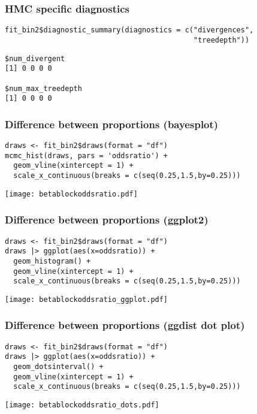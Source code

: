 \documentclass[finnish,english,t]{beamer}
\begin{document}
\begin{frame}[fragile]
  \frametitle{HMC specific diagnostics}
  
  {\small
\begin{lstlisting}[]
fit_bin2$diagnostic_summary(diagnostics = c("divergences",
                                            "treedepth"))
\end{lstlisting}
  }

  {\scriptsize
\begin{lstlisting}
$num_divergent
[1] 0 0 0 0

$num_max_treedepth
[1] 0 0 0 0
\end{lstlisting}
  }

\end{frame}

\begin{frame}[fragile]
  \frametitle{Difference between proportions (bayesplot)}
  
  {\small
\begin{lstlisting}
draws <- fit_bin2$draws(format = "df")
mcmc_hist(draws, pars = 'oddsratio') +
  geom_vline(xintercept = 1) +
  scale_x_continuous(breaks = c(seq(0.25,1.5,by=0.25)))
\end{lstlisting}
  }

  \begin{center}
  \texttt{[image: betablockoddsratio.pdf]}
\end{center}
\end{frame}

\begin{frame}[fragile]
  \frametitle{Difference between proportions (ggplot2)}

  \vspace{-0.5\baselineskip}
  {\small
\begin{lstlisting}
draws <- fit_bin2$draws(format = "df")
draws |> ggplot(aes(x=oddsratio)) +
  geom_histogram() +
  geom_vline(xintercept = 1) +
  scale_x_continuous(breaks = c(seq(0.25,1.5,by=0.25)))
\end{lstlisting}
  }

  \begin{center}
  \texttt{[image: betablockoddsratio\_ggplot.pdf]}
\end{center}
\end{frame}

\begin{frame}[fragile]
  \frametitle{Difference between proportions (ggdist dot plot)}
  
  \vspace{-0.5\baselineskip}
  {\small
\begin{lstlisting}
draws <- fit_bin2$draws(format = "df")
draws |> ggplot(aes(x=oddsratio)) +
  geom_dotsinterval() +
  geom_vline(xintercept = 1) +
  scale_x_continuous(breaks = c(seq(0.25,1.5,by=0.25)))
\end{lstlisting}
  }

  \begin{center}
  \texttt{[image: betablockoddsratio\_dots.pdf]}
\end{center}
\end{frame}
\end{document}
